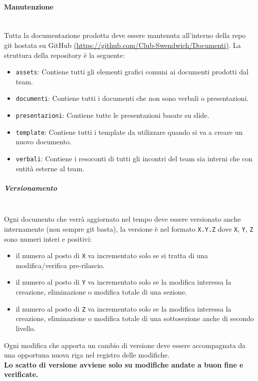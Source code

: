 \paragraph{Manutenzione}
\mbox{}\\
Tutta la documentazione prodotta deve essere mantenuta all'interno della repo git hostata su GitHub \href{https://github.com/Club-Swendwich/Documenti}{(https://github.com/Club-Swendwich/Documenti)}.
La struttura della repository è la seguente:
\begin{itemize}
    \item \texttt{assets}: Contiene tutti gli elementi grafici comuni ai documenti
        prodotti dal team.
    \item \texttt{documenti}: Contiene tutti i documenti che non sono verbali o
        presentazioni.
    \item \texttt{presentazioni}: Contiene tutte le presentazioni basate su slide.
    \item \texttt{template}: Contiene tutti i template da utilizzare quando si va a
        creare un nuovo documento.
    \item \texttt{verbali}: Contiene i resoconti di tutti gli incontri del team sia
        interni che con entità esterne al team.
\end{itemize}

\subparagraph{Versionamento}
\mbox{}\\
Ogni documento che verrà aggiornato nel tempo deve essere versionato anche
internamente (non sempre git basta), la versione è nel formato \texttt{X.Y.Z} dove
\texttt{X}, \texttt{Y}, \texttt{Z} sono numeri interi e positivi:
\begin{itemize}
    \item il numero al posto di \texttt{X} va incrementato solo se si tratta di una
    modifica/verifica pre-rilascio.
    \item il numero al posto di \texttt{Y} va incrementato solo se la modifica
    interessa la creazione, eliminazione o modifica totale di una sezione.
    \item il numero al posto di \texttt{Z} va incrementato solo se la modifica
    interessa la creazione, eliminazione o modifica totale di una sottosezione
    anche di secondo livello.
\end{itemize}
Ogni modifica che apporta un cambio di versione deve essere accompagnata da una
opportuna nuova riga nel registro delle modifiche.
\\

\noindent
\textbf{Lo scatto di versione avviene solo su modifiche andate a buon fine e verificate.}
\\

